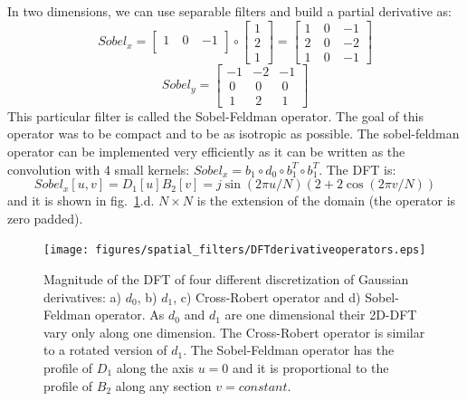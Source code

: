 In two dimensions, we can use separable filters and build a partial derivative as:
\begin{equation}
	Sobel_x =  \begin{bmatrix}
		1 ~ & 0 ~ & -1 \\
	\end{bmatrix}\circ \begin{bmatrix}
		1 \\
		2 \\
		1
	\end{bmatrix}=
	\begin{bmatrix}
		1 ~ & 0 ~ & -1 \\
		2 ~ & 0 ~ & -2 \\
		1~  & 0 ~ & -1
	\end{bmatrix}
\end{equation}
\begin{equation}
	Sobel_y =  \begin{bmatrix}
		-1 & -2 & -1 \\
		~0 & ~0 & ~0 \\
		~1 & ~2 & ~1
	\end{bmatrix}
\end{equation}
This particular filter is called the Sobel-Feldman operator. The goal of this operator was to be compact and to be as isotropic as possible. The sobel-feldman operator can be implemented very efficiently as it can be written as the convolution with 4 small kernels: $Sobel_x=b_1 \circ d_0 \circ b_1^T \circ b_1^T$.  The DFT is:
\begin{equation}
	Sobel_x \left[u,v \right] = D_1\left[u\right] B_2 \left[v \right] = j \sin \left( 2 \pi u /N \right) \left( 2+2 \cos \left(2 \pi v/N \right) \right)
\end{equation}
and it is shown in fig.~\ref{fig:DFTderivativeoperators}.d. $N \times N$ is the extension of the domain (the operator is zero padded).

\begin{figure}
	\centerline{
		\texttt{[image: figures/spatial\_filters/DFTderivativeoperators.eps]}}
	\caption{Magnitude of the DFT of four different discretization of Gaussian derivatives: a) $d_0$, b) $d_1$, c) Cross-Robert operator and d) Sobel-Feldman operator.  As $d_0$ and $d_1$ are one dimensional their 2D-DFT vary only along one dimension. The Cross-Robert operator is similar to a rotated version of $d_1$. The Sobel-Feldman operator has the profile of $D_1$ along the axis $u=0$ and it is proportional to the profile of $B_2$ along any section $v=constant$.
	}
	\label{fig:DFTderivativeoperators}
\end{figure}

